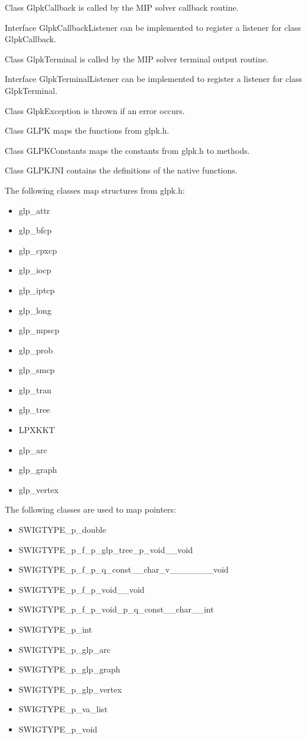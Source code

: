 \documentclass[a4paper,11pt]{report}
\begin{document}
Class GlpkCallback is called by the MIP solver callback routine.

Interface GlpkCallbackListener can be implemented to register a listener for
class GlpkCallback.

Class GlpkTerminal is called by the MIP solver terminal output routine.

Interface GlpkTerminalListener can be implemented to register a listener for
class GlpkTerminal.

Class GlpkException is thrown if an error occurs.

Class GLPK maps the functions from glpk.h.

Class GLPKConstants maps the constants from glpk.h to methods.

Class GLPKJNI contains the definitions of the native functions.

The following classes map structures from glpk.h:
\begin{itemize}
\item glp\_attr
\item glp\_bfcp
\item glp\_cpxcp
\item glp\_iocp
\item glp\_iptcp
\item glp\_long
\item glp\_mpscp
\item glp\_prob
\item glp\_smcp
\item glp\_tran
\item glp\_tree
\item LPXKKT
\item glp\_arc
\item glp\_graph
\item glp\_vertex
\end{itemize}

The following classes are used to map pointers:
\begin{itemize}
\item SWIGTYPE\_p\_double
\item SWIGTYPE\_p\_f\_p\_glp\_tree\_p\_void\_\_void
\item SWIGTYPE\_p\_f\_p\_q\_const\_\_char\_v\_\_\_\_\_\_\_void
\item SWIGTYPE\_p\_f\_p\_void\_\_void
\item SWIGTYPE\_p\_f\_p\_void\_p\_q\_const\_\_char\_\_int
\item SWIGTYPE\_p\_int
\item SWIGTYPE\_p\_glp\_arc
\item SWIGTYPE\_p\_glp\_graph
\item SWIGTYPE\_p\_glp\_vertex
\item SWIGTYPE\_p\_va\_list
\item SWIGTYPE\_p\_void
\end{itemize}
\end{document}
